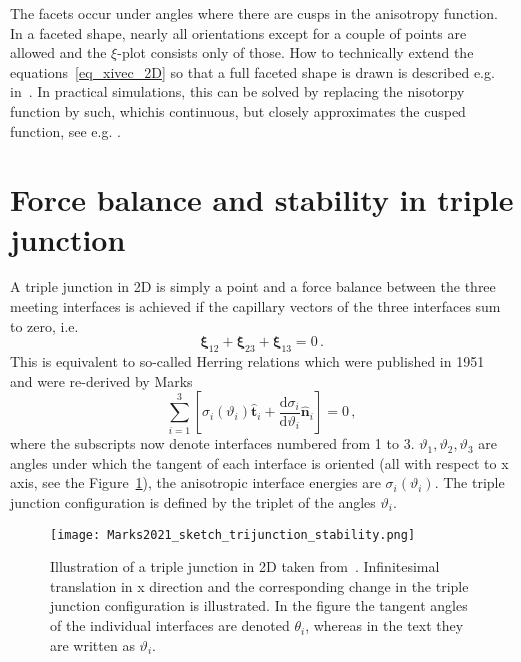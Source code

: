 The facets occur under angles where there are cusps in the anisotropy function. In a faceted shape, nearly all orientations except for a couple of points are allowed and the $\xi$-plot consists only of those. How to technically extend the equations~\eqref{eq_xivec_2D} so that a full faceted shape is drawn is described e.g. in~\cite{Kobayashi2001}. In practical simulations, this can be solved by replacing the nisotorpy function by such, whichis continuous, but closely approximates the cusped function, see e.g. \cite{Debierre2003}.

\section{Force balance and stability in triple junction} \label{sec_intro_trijun_forcebalance_stability}
A triple junction in 2D is simply a point and a force balance between the three meeting interfaces is achieved if the capillary vectors of the three interfaces sum to zero, i.e.~\cite{Hoffman1972}
\begin{equation} \label{eq_trijun_forcebalance_sum_xivec}
    \bm{\xi}_{12}+\bm{\xi}_{23}+\bm{\xi}_{13}=0 \,.
\end{equation}
This is equivalent to so-called Herring relations which were published in 1951~\cite{Herring1999} and were re-derived by Marks~\cite{Marks2012}
\begin{equation} \label{eq_force_balance_3jun_aniso}
	\sum_{i=1}^3 \left[ \sigma_i(\vartheta_i)\hat{\bm{t}}_i +\frac{\mathrm{d} \sigma_i}{\mathrm{d} \vartheta_i}\hat{\bm{n}}_i \right] = 0 \,,
\end{equation}
where the subscripts now denote interfaces numbered from 1 to 3. $\vartheta_1,\vartheta_2,\vartheta_3$ are angles under which the tangent of each interface is oriented (all with respect to x axis, see the Figure~\ref{fig_Marks2012_sketch_trijun}), the anisotropic interface energies are $\sigma_i(\vartheta_i)$. The triple junction configuration is defined by the triplet of the angles $\vartheta_i$.
\begin{figure}
	\centering
	\texttt{[image: Marks2021\_sketch\_trijunction\_stability.png]}
	\caption{Illustration of a triple junction in 2D taken from~\cite{Marks2012}. Infinitesimal translation in x direction and the corresponding change in the triple junction configuration is illustrated. In the figure the tangent angles of  the individual interfaces are denoted $\theta_i$, whereas in the text they are written as $\vartheta_i$.}
	\label{fig_Marks2012_sketch_trijun}
\end{figure}
